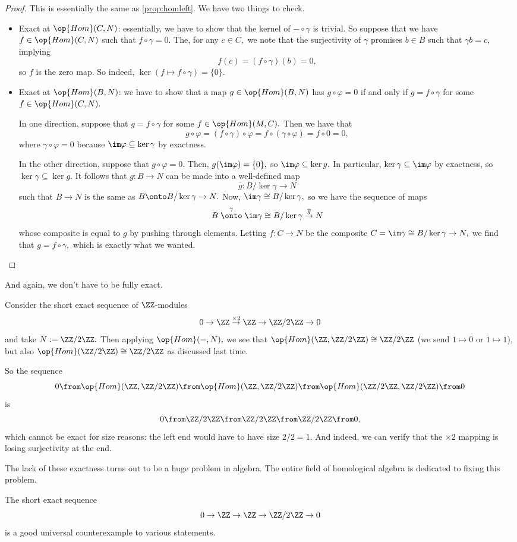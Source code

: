 \begin{proof}
	This is essentially the same as \autoref{prop:homleft}. We have two things to check.
	\begin{itemize}
		\item Exact at $\op{Hom}(C,N)$: essentially, we have to show that the kernel of $-\circ\gamma$ is trivial. So suppose that we have $f\in\op{Hom}(C,N)$ such that $f\circ\gamma=0.$ The, for any $c\in C,$ we note that the surjectivity of $\gamma$ promises $b\in B$ such that $\gamma b=c,$ implying
		\[f(c)=(f\circ\gamma)(b)=0,\]
		so $f$ is the zero map. So indeed, $\ker(f\mapsto f\circ\gamma)=\{0\}.$

		\item Exact at $\op{Hom}(B,N)$: we have to show that a map $g\in\op{Hom}(B,N)$ has $g\circ\varphi=0$ if and only if $g=f\circ\gamma$ for some $f\in\op{Hom}(C,N).$

		In one direction, suppose that $g=f\circ\gamma$ for some $f\in\op{Hom}(M,C).$ Then we have that
		\[g\circ\varphi=(f\circ\gamma)\circ\varphi=f\circ(\gamma\circ\varphi)=f\circ0=0,\]
		where $\gamma\circ\varphi=0$ because $\im\varphi\subseteq\ker\gamma$ by exactness.

		In the other direction, suppose that $g\circ\varphi=0.$ Then, $g(\im\varphi)=\{0\},$ so $\im\varphi\subseteq\ker g.$ In particular, $\ker\gamma\subseteq\im\varphi$ by exactness, so $\ker\gamma\subseteq\ker g.$ It follows that $g:B\to N$ can be made into a well-defined map
		\[\overline g:B/\ker\gamma\to N\]
		such that $B\to N$ is the same as $B\onto B/\ker\gamma\to N.$ Now, $\im\gamma\cong B/\ker\gamma,$ so we have the sequence of maps
		\[B\stackrel\gamma\onto\im\gamma\cong B/\ker\gamma\stackrel{\overline g}\to N\]
		whose composite is equal to $g$ by pushing through elements. Letting $f:C\to N$ be the composite $C=\im\gamma\cong B/\ker\gamma\to N,$ we find that $g=f\circ\gamma,$ which is exactly what we wanted.
		\qedhere
	\end{itemize}
\end{proof}
And again, we don't have to be fully exact.
\begin{example}
	Consider the short exact sequence of $\ZZ$-modules
	\[0\to\ZZ\stackrel{\times2}\to\ZZ\to\ZZ/2\ZZ\to0\]
	and take $N:=\ZZ/2\ZZ.$ Then applying $\op{Hom}(-,N),$ we see that $\op{Hom}(\ZZ,\ZZ/2\ZZ)\cong\ZZ/2\ZZ$ (we send $1\mapsto0$ or $1\mapsto1$), but also $\op{Hom}(\ZZ/2\ZZ)\cong\ZZ/2\ZZ$ as discussed last time.
	
	So the sequence
	\[0\from\op{Hom}(\ZZ,\ZZ/2\ZZ)\from\op{Hom}(\ZZ,\ZZ/2\ZZ)\from\op{Hom}(\ZZ/2\ZZ,\ZZ/2\ZZ)\from0\]
	is
	\[0\from\ZZ/2\ZZ\from\ZZ/2\ZZ\from\ZZ/2\ZZ\from0,\]
	which cannot be exact for size reasons: the left end would have to have size $2/2=1.$ And indeed, we can verify that the $\times2$ mapping is losing surjectivity at the end.
\end{example}
The lack of these exactness turns out to be a huge problem in algebra. The entire field of homological algebra is dedicated to fixing this problem.
\begin{remark}
	The short exact sequence
	\[0\to\ZZ\to\ZZ\to\ZZ/2\ZZ\to0\]
	is a good universal counterexample to various statements.
\end{remark}

